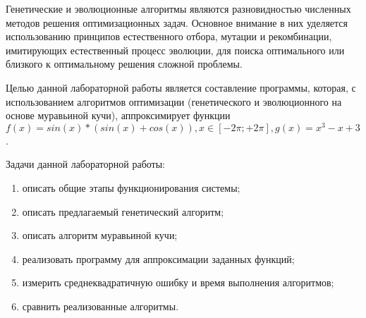 
Генетические и эволюционные алгоритмы являются разновидностью численных методов решения оптимизационных задач. Основное внимание в них уделяется использованию 
принципов естественного отбора, мутации и рекомбинации, имитирующих естественный процесс эволюции, для поиска оптимального или близкого к оптимальному решения 
сложной проблемы.

Целью данной лабораторной работы является составление программы, которая, с использованием алгоритмов оптимизации (генетического и эволюционного на основе муравьиной кучи), аппроксимирует функции $f(x) = sin(x)*(sin(x)+cos(x)), x\in [-2\pi; +2\pi], g(x) = x^3 - x +3$.

Задачи данной лабораторной работы:
\begin{enumerate}[label*=\arabic*)]
	\item описать общие этапы функционирования системы;
	\item описать предлагаемый генетический алгоритм;
	\item описать алгоритм муравьиной кучи;
	\item реализовать программу для аппроксимации заданных функций;
	\item измерить среднеквадратичную ошибку и время выполнения алгоритмов;
	\item сравнить реализованные алгоритмы.
\end{enumerate}

\clearpage
